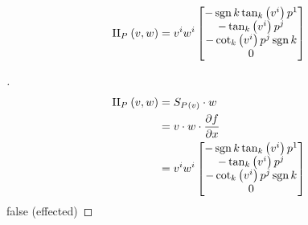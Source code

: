 \documentclass[stu, babel, american, biblatex, a4paper, draftall]{apa7}
\begin{document}
\begin{lemma}\label{Model:SecondFundamental}
    \begin{equation*}
        \text{II}_{\tensor{P}{}}\left(v,w\right) = \tensor{v}{^i}\tensor{w}{^i} \begin{bmatrix}
            -\sign{k}\tan_k\left(\tensor{v}{^i}\right)\tensor{p}{^1} \\
            -\tan_k\left(\tensor{v}{^i}\right)\tensor{p}{^j}         \\
            -\cot_k\left(\tensor{v}{^i}\right)\tensor{p}{^j}\sign{k} \\
            0                                                        \\
        \end{bmatrix}
    \end{equation*}
\end{lemma}
\begin{proof}[]
    \skipped

    \begin{align*}
        \text{II}_{\tensor{P}{}}\left(v,w\right)
         & = S_{\tensor{P}{}\left(v\right)} \cdot w                  \\
         & = v \cdot w \cdot \frac{\partial f}{\partial x}           \\
         & = \tensor{v}{^i}\tensor{w}{^i} \begin{bmatrix}
            -\sign{k}\tan_k\left(\tensor{v}{^i}\right)\tensor{p}{^1} \\
            -\tan_k\left(\tensor{v}{^i}\right)\tensor{p}{^j}         \\
            -\cot_k\left(\tensor{v}{^i}\right)\tensor{p}{^j}\sign{k} \\
            0                                                        \\
        \end{bmatrix}
    \end{align*}
    false (effected)
\end{proof}
\begin{lemma}\label{Model:PrincipalCurvature}

\end{lemma}
\end{document}
